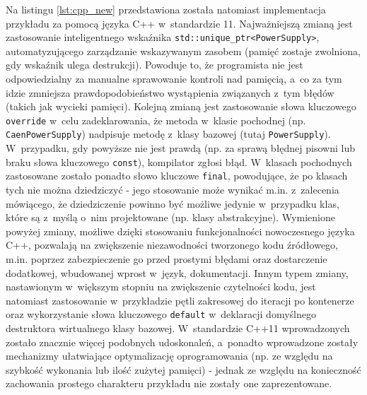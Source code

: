 


Na listingu \ref{lst:cpp_new} przedstawiona została natomiast implementacja przykładu za pomocą języka C++ w~standardzie 11. Najważniejszą zmianą jest zastosowanie inteligentnego wskaźnika \lstinline{std::unique_ptr<PowerSupply>}, automatyzującego zarządzanie wskazywanym zasobem (pamięć zostaje zwolniona, gdy wskaźnik ulega destrukcji). Powoduje to, że programista nie jest odpowiedzialny za manualne sprawowanie kontroli nad pamięcią, a~co za tym idzie zmniejsza prawdopodobieństwo wystąpienia związanych z~tym błędów (takich jak wycieki pamięci). Kolejną zmianą jest zastosowanie słowa kluczowego \lstinline{override} w~celu zadeklarowania, że metoda w~klasie pochodnej (np. \lstinline{CaenPowerSupply}) nadpisuje metodę z~klasy bazowej (tutaj \lstinline{PowerSupply}). W~przypadku, gdy powyższe nie jest prawdą (np. za sprawą błędnej pisowni lub braku słowa kluczowego \lstinline{const}), kompilator zgłosi błąd. W~klasach pochodnych zastosowane zostało ponadto słowo kluczowe \lstinline{final}, powodujące, że po klasach tych nie można dziedziczyć - jego stosowanie może wynikać m.in. z~zalecenia mówiącego, że dziedziczenie powinno być możliwe jedynie w~przypadku klas, które są z~myślą o~nim projektowane (np. klasy abstrakcyjne). Wymienione powyżej zmiany, możliwe dzięki stosowaniu funkcjonalności nowoczesnego języka C++, pozwalają na zwiększenie niezawodności tworzonego kodu źródłowego, m.in. poprzez zabezpieczenie go przed prostymi błędami oraz dostarczenie dodatkowej, wbudowanej wprost w~język, dokumentacji. Innym typem zmiany, nastawionym w~większym stopniu na zwiększenie czytelności kodu, jest natomiast zastosowanie w~przykładzie pętli zakresowej do iteracji po kontenerze oraz wykorzystanie słowa kluczowego \lstinline{default} w~deklaracji domyślnego destruktora wirtualnego klasy bazowej. W~standardzie C++11 wprowadzonych zostało znacznie więcej podobnych udoskonaleń, a~ponadto wprowadzone zostały mechanizmy ułatwiające optymalizację oprogramowania (np. ze względu na szybkość wykonania lub ilość zużytej pamięci) - jednak ze względu na konieczność zachowania prostego charakteru przykładu nie zostały one zaprezentowane.

